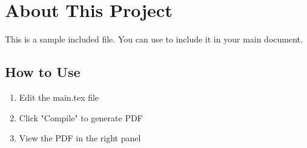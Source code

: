 \section{About This Project}

This is a sample included file. 
You can use \verb|| to include it in your main document.

\subsection{How to Use}

\begin{enumerate}
    \item Edit the main.tex file
    \item Click "Compile" to generate PDF
    \item View the PDF in the right panel
\end{enumerate}